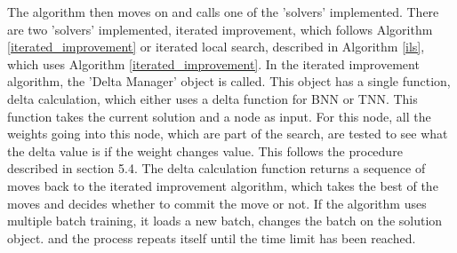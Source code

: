 \noindent The algorithm then moves on and calls one of the 'solvers' implemented. There are two 'solvers' implemented, iterated improvement, which follows Algorithm \ref{iterated_improvement} or iterated local search, described in Algorithm \ref{ils}, which uses Algorithm \ref{iterated_improvement}. In the iterated improvement algorithm, the 'Delta Manager' object is called. This object has a single function, delta calculation, which either uses a delta function for BNN or TNN. This function takes the current solution and a node as input. For this node, all the weights going into this node, which are part of the search, are tested to see what the delta value is if the weight changes value. This follows the procedure described in section 5.4. The delta calculation function returns a sequence of moves back to the iterated improvement algorithm, which takes the best of the moves and decides whether to commit the move or not. If the algorithm uses multiple batch training, it loads a new batch, changes the batch on the solution object. and the process repeats itself until the time limit has been reached. \\